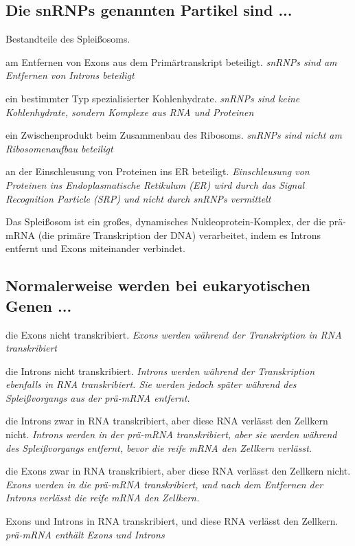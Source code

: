 \documentclass{article}
\newcommand{\cmark}{\ding{51}}%
\newcommand{\done}{\rlap{$\square$}{\raisebox{2pt}{\large\hspace{1pt}\cmark}}%
\hspace{-2.5pt}}
\begin{document}
\subsection*{Die snRNPs genannten Partikel sind ...}
\begin{todolist}%
\item[\done] Bestandteile des Spleißosoms. 
\item am Entfernen von Exons aus dem Primärtranskript beteiligt. \textit{\scriptsize snRNPs sind am Entfernen von Introns beteiligt}
\item ein bestimmter Typ spezialisierter Kohlenhydrate. \textit{\scriptsize snRNPs sind keine Kohlenhydrate, sondern Komplexe aus RNA und Proteinen}
\item ein Zwischenprodukt beim Zusammenbau des Ribosoms. \textit{\scriptsize snRNPs sind nicht am Ribosomenaufbau beteiligt}
\item an der Einschleusung von Proteinen ins ER beteiligt. \textit{\scriptsize Einschleusung von Proteinen ins Endoplasmatische Retikulum (ER) wird durch das Signal Recognition Particle (SRP) und nicht durch snRNPs vermittelt}
\end{todolist}
\begin{mybox}[title={Spleißosom}]
Das Spleißosom ist ein großes, dynamisches Nukleoprotein-Komplex, der die prä-mRNA (die primäre Transkription der DNA) verarbeitet, indem es Introns entfernt und Exons miteinander verbindet.
\end{mybox}

\subsection*{Normalerweise werden bei eukaryotischen Genen ...}
\begin{todolist}%
\item die Exons nicht transkribiert. \textit{\scriptsize Exons werden während der Transkription in RNA transkribiert}
\item die Introns nicht transkribiert. \textit{\scriptsize Introns werden während der Transkription ebenfalls in RNA transkribiert. Sie werden jedoch später während des Spleißvorgangs aus der prä-mRNA entfernt.}
\item[\done] die Introns zwar in RNA transkribiert, aber diese RNA verlässt den
Zellkern nicht. \textit{\scriptsize Introns werden in der prä-mRNA transkribiert, aber sie werden während des Spleißvorgangs entfernt, bevor die reife mRNA den Zellkern verlässt.}
\item die Exons zwar in RNA transkribiert, aber diese RNA verlässt den
Zellkern nicht. \textit{\scriptsize Exons werden in die prä-mRNA transkribiert, und nach dem Entfernen der Introns verlässt die reife mRNA den Zellkern.}
\item Exons und Introns in RNA transkribiert, und diese RNA verlässt den
Zellkern. \textit{\scriptsize prä-mRNA enthält Exons und Introns}
\end{todolist}
\end{document}
